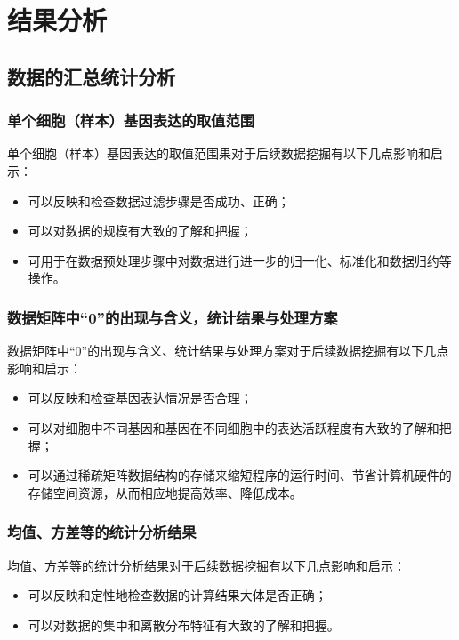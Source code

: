 \documentclass {article}
\begin{document}
\section{结果分析}
	\subsection{数据的汇总统计分析}
		\subsubsection{单个细胞（样本）基因表达的取值范围}
			单个细胞（样本）基因表达的取值范围果对于后续数据挖掘有以下几点影响和启示：
			\begin{itemize}
				\item 可以反映和检查数据过滤步骤是否成功、正确；
				\item 可以对数据的规模有大致的了解和把握；
				\item 可用于在数据预处理步骤中对数据进行进一步的归一化、标准化和数据归约等操作。
			\end{itemize}
		
		\subsubsection{数据矩阵中“0”的出现与含义，统计结果与处理方案}
			数据矩阵中“0”的出现与含义、统计结果与处理方案对于后续数据挖掘有以下几点影响和启示：
			\begin{itemize}
				\item 可以反映和检查基因表达情况是否合理；
				\item 可以对细胞中不同基因和基因在不同细胞中的表达活跃程度有大致的了解和把握；
				\item 可以通过稀疏矩阵数据结构的存储来缩短程序的运行时间、节省计算机硬件的存储空间资源，从而相应地提高效率、降低成本。
			\end{itemize}			
		
		\subsubsection{均值、方差等的统计分析结果}
			均值、方差等的统计分析结果对于后续数据挖掘有以下几点影响和启示：
			\begin{itemize}
				\item 可以反映和定性地检查数据的计算结果大体是否正确；
				\item 可以对数据的集中和离散分布特征有大致的了解和把握。
			\end{itemize}
\end{document}
